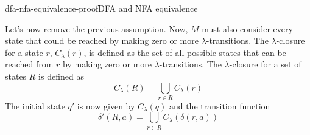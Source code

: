 \documentclass[preview]{standalone}
\newcommand{\emptyString}{\lambda}
\begin{document}
\begin{snippetproof}{dfa-nfa-equivalence-proof}{DFA and NFA equivalence}
\begin{enumerate}
        Let's now remove the previous assumption. Now, \(M\)
        must also consider every state that could be reached by
        making zero or more \(\emptyString\)-transitions.
        The \(\emptyString\)-closure
        for a state \(r\), \(C_\emptyString(r)\), is defined as
        the set of all possible states that can be reached from \(r\) by making
        zero or more \(\emptyString\)-transitions.
        The \(\emptyString\)-closure for a set of states \(R\) is defined as
        \[
            C_\emptyString(R) = \bigcup_{r\in R}C_\emptyString(r)
        \]
        The initial state \(q'\) is now given by \(C_\emptyString(q)\)
        and the transition function
        \[
            \delta'(R, a) = \bigcup_{r\in R}C_\emptyString(\delta(r, a))
        \]
    \end{enumerate}
\end{snippetproof}

\end{document}
